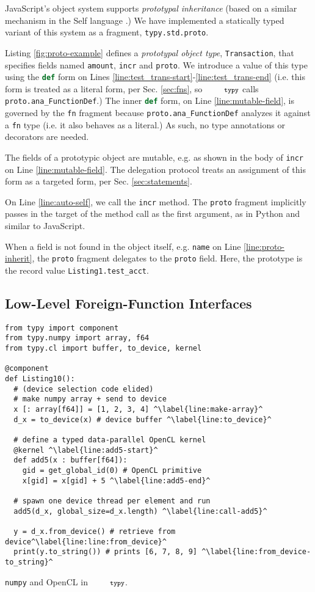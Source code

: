 \documentclass[10pt]{sigplanconf}
\newcommand{\typy}{\texttt{\footnotesize typy}}
\newcommand{\lip}[1]{\lstinline[language=Python,basicstyle=\ttfamily\footnotesize,morekeywords={with},deletendkeywords={tuple,buffer,map}]{#1}}
\newcommand{\li}[1]{\lip{#1}}
\begin{document}
JavaScript's object system supports \emph{prototypal inheritance} (based on a similar mechanism in the Self language \cite{Ungar:Smith:oopsla:1987,Lie86}.) We have implemented a statically typed variant of this system as a fragment, \li{typy.std.proto}. 

Listing \ref{fig:proto-example} defines a \emph{prototypal object type}, \li{Transaction}, that specifies fields named \li{amount}, \li{incr} and \li{proto}. We introduce a value of this type using the \li{def} form on Lines \ref{line:test_trans-start}-\ref{line:test_trans-end} (i.e. this form is treated as a literal form, per Sec. \ref{sec:fns}, so $\typy$ calls \li{proto.ana_FunctionDef}.) The inner \li{def} form, on Line \ref{line:mutable-field}, is governed by the \li{fn} fragment because \li{proto.ana_FunctionDef} analyzes it against a \li{fn} type (i.e. it also behaves as a literal.) As such, no type annotations or decorators are needed.

The fields of a prototypic object are mutable, e.g. as shown in the body of \li{incr} on Line \ref{line:mutable-field}. The delegation protocol treats an assignment of this form as a targeted form, per Sec. \ref{sec:statements}.

On Line \ref{line:auto-self}, we call the \li{incr} method. The \li{proto} fragment implicitly passes in the target of the method call as the first argument, as in Python and similar to JavaScript.

When a field is not found in the object itself, e.g. \li{name} on Line \ref{line:proto-inherit}, the \li{proto} fragment delegates to the \li{proto} field. Here, the prototype is the record value \li{Listing1.test_acct}. 

\subsection{Low-Level Foreign-Function Interfaces}\label{sec:ffis}


\begin{codelisting}[t]
\vspace{-3px}
\begin{lstlisting}
from typy import component
from typy.numpy import array, f64
from typy.cl import buffer, to_device, kernel

@component
def Listing10():
  # (device selection code elided)
  # make numpy array + send to device
  x [: array[f64]] = [1, 2, 3, 4] ^\label{line:make-array}^
  d_x = to_device(x) # device buffer ^\label{line:to_device}^

  # define a typed data-parallel OpenCL kernel
  @kernel ^\label{line:add5-start}^
  def add5(x : buffer[f64]):
    gid = get_global_id(0) # OpenCL primitive
    x[gid] = x[gid] + 5 ^\label{line:add5-end}^

  # spawn one device thread per element and run
  add5(d_x, global_size=d_x.length) ^\label{line:call-add5}^

  y = d_x.from_device() # retrieve from device^\label{line:line:from_device}^
  print(y.to_string()) # prints [6, 7, 8, 9] ^\label{line:from_device-to_string}^
\end{lstlisting}
\caption{\li{numpy} and OpenCL in $\typy$.}
\label{fig:numerics}
\end{codelisting}
\end{document}
